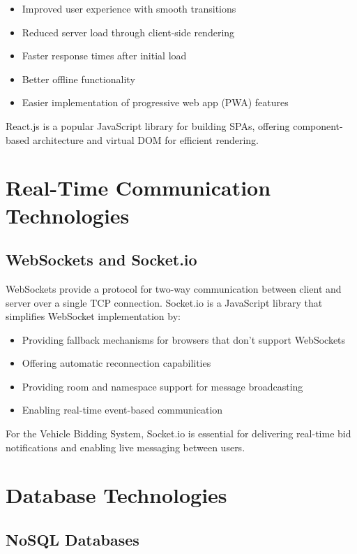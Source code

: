 \begin{itemize}
    \item Improved user experience with smooth transitions
    \item Reduced server load through client-side rendering
    \item Faster response times after initial load
    \item Better offline functionality
    \item Easier implementation of progressive web app (PWA) features
\end{itemize}

React.js is a popular JavaScript library for building SPAs, offering component-based architecture and virtual DOM for efficient rendering.

\section{Real-Time Communication Technologies}

\subsection{WebSockets and Socket.io}

WebSockets provide a protocol for two-way communication between client and server over a single TCP connection. Socket.io is a JavaScript library that simplifies WebSocket implementation by:

\begin{itemize}
    \item Providing fallback mechanisms for browsers that don't support WebSockets
    \item Offering automatic reconnection capabilities
    \item Providing room and namespace support for message broadcasting
    \item Enabling real-time event-based communication
\end{itemize}

For the Vehicle Bidding System, Socket.io is essential for delivering real-time bid notifications and enabling live messaging between users.

\section{Database Technologies}

\subsection{NoSQL Databases}


